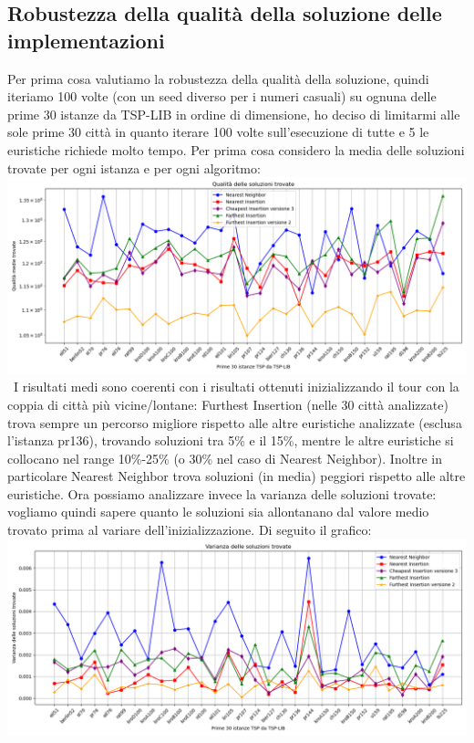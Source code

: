 \documentclass[a4paper,12pt]{report}
\begin{document}
\subsection{Robustezza della qualità della soluzione delle implementazioni}
Per prima cosa valutiamo la robustezza della qualità della soluzione, quindi iteriamo 100 volte (con un seed diverso per i numeri casuali) su ognuna delle prime 30 istanze da TSP-LIB in ordine di dimensione, ho deciso di limitarmi alle sole prime 30 città in quanto iterare 100 volte sull'esecuzione di tutte e 5 le euristiche richiede molto tempo. Per prima cosa considero la media delle soluzioni trovate per ogni istanza e per ogni algoritmo: \newline
\includegraphics[width=1\textwidth]{../Grafici/9.png} \
I risultati medi sono coerenti con i risultati ottenuti inizializzando il tour con la coppia di città più vicine/lontane: Furthest Insertion (nelle 30 città analizzate) trova sempre un percorso migliore rispetto alle altre euristiche analizzate (esclusa l'istanza pr136), trovando soluzioni tra 5\% e il 15\%, mentre le altre euristiche si collocano nel range 10\%-25\% (o 30\% nel caso di Nearest Neighbor). Inoltre in particolare Nearest Neighbor trova soluzioni (in media) peggiori rispetto alle altre euristiche. \newline 
Ora possiamo analizzare invece la varianza delle soluzioni trovate: vogliamo quindi sapere quanto le soluzioni sia allontanano dal valore medio trovato prima al variare dell'inizializzazione. Di seguito il grafico: \newline
\includegraphics[width=1\textwidth]{../Grafici/10.png} \
\end{document}
